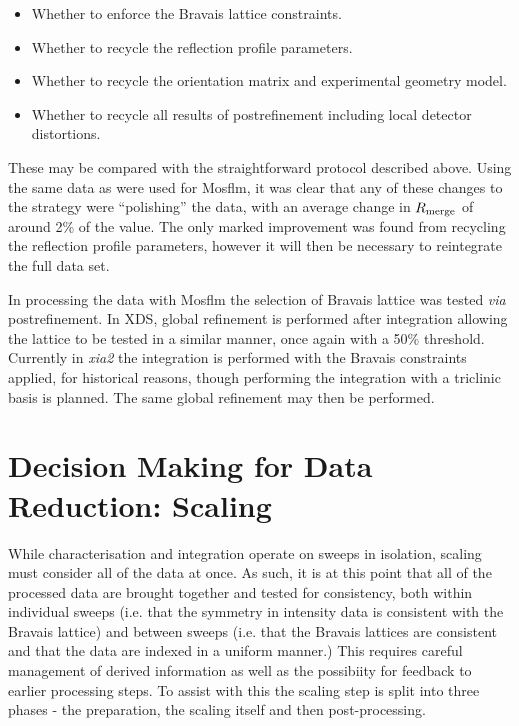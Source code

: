 \documentclass[preprint,pdf]{iucr}
\begin{document}
\begin{itemize}
\item{Whether to enforce the Bravais lattice constraints.}
\item{Whether to recycle the reflection profile parameters.}
\item{Whether to recycle the orientation matrix and experimental
    geometry model.}
\item{Whether to recycle all results of postrefinement including local
    detector distortions.}
\end{itemize}

\noindent
These may be compared with the straightforward protocol described above. Using
the same data as were used for Mosflm, it was
clear that any of these changes to the strategy were ``polishing'' the
data, with an average change in $R_{\rm{merge}}$ of around 2\% of the
value. The only marked improvement was found from recycling the
reflection profile parameters, however it will then be necessary
to reintegrate the full data set.

In processing the data with Mosflm the selection of Bravais lattice
was tested \emph{via} postrefinement. In XDS, global refinement is
performed after integration allowing the lattice to be tested in a
similar manner, once again with a 50\% threshold. Currently in
\emph{xia2} the integration is performed with the Bravais constraints
applied, for historical reasons, though performing the integration
with a triclinic basis is planned. The same global refinement may then
be performed.

\section{Decision Making for Data Reduction: Scaling}

While characterisation and integration operate on sweeps in isolation,
scaling must consider all of the data at once. As such, it is at this
point that all of the processed data are brought together and tested
for consistency, both within individual sweeps (i.e. that the symmetry
in intensity data is consistent with the Bravais lattice) and between
sweeps (i.e. that the Bravais lattices are consistent and that the
data are indexed in a uniform manner.) This requires careful
management of derived information as well as the possibiity for feedback to
earlier processing steps. To assist with this the scaling step is
split into three phases - the preparation, the scaling itself and then
post-processing.
\end{document}
